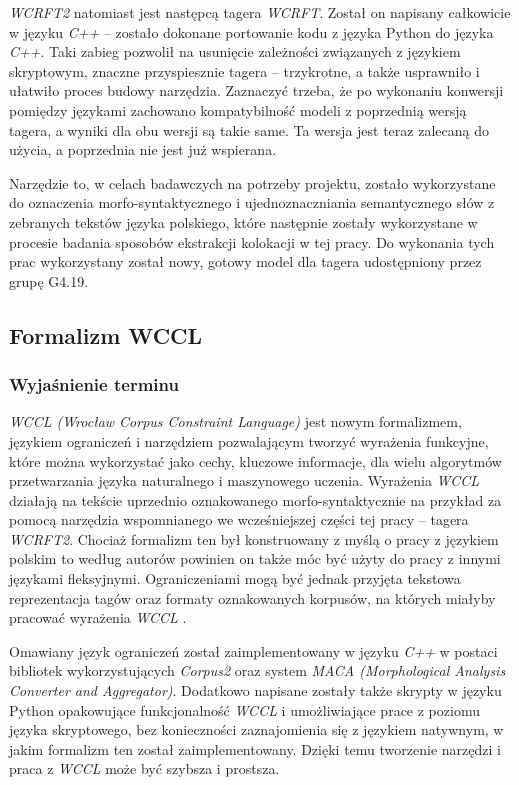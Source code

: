 \documentclass[11pt,a4paper]{llncs}
\begin{document}
\emph{WCRFT2} natomiast jest następcą tagera \emph{WCRFT}.
Został on napisany całkowicie w języku \emph{C++} -- zostało dokonane portowanie kodu z języka Python do języka \emph{C++}.
Taki zabieg pozwolił na usunięcie zależności związanych z językiem skryptowym, znaczne przyspiesznie tagera -- trzykrotne, a także usprawniło i ułatwiło proces budowy narzędzia.
Zaznaczyć trzeba, że po wykonaniu konwersji pomiędzy językami zachowano kompatybilność modeli z poprzednią wersją tagera, a wyniki dla obu wersji są takie same.
Ta wersja jest teraz zalecaną do użycia, a poprzednia nie jest już wspierana.



Narzędzie to, w celach badawczych na potrzeby projektu, zostało wykorzystane do oznaczenia morfo-syntaktycznego i ujednoznaczniania semantycznego słów z zebranych tekstów języka polskiego, które następnie zostały wykorzystane w procesie badania sposobów ekstrakcji kolokacji w tej pracy.
Do wykonania tych prac wykorzystany został nowy, gotowy model dla tagera udostępniony przez grupę G4.19.


\subsection{Formalizm WCCL}


\subsubsection{Wyjaśnienie terminu}
\emph{WCCL (Wrocław Corpus Constraint Language)} jest nowym formalizmem, językiem ograniczeń i narzędziem pozwalającym tworzyć wyrażenia funkcyjne, które można wykorzystać jako cechy, kluczowe informacje, dla wielu algorytmów przetwarzania języka naturalnego i maszynowego uczenia. 
Wyrażenia \emph{WCCL} działają na tekście uprzednio oznakowanego morfo-syntaktycznie na przykład za pomocą narzędzia wspomnianego we wcześniejszej części tej pracy -- tagera \emph{WCRFT2}. 
Chociaż formalizm ten był konstruowany z myślą o pracy z językiem polskim to według autorów powinien on także móc być użyty do pracy z innymi językami fleksyjnymi. 
Ograniczeniami mogą być jednak przyjęta tekstowa reprezentacja tagów oraz formaty oznakowanych korpusów, na których miałyby pracować wyrażenia \emph{WCCL} \cite[str. 1]{wccl}.



Omawiany język ograniczeń został zaimplementowany w języku \emph{C++} w postaci bibliotek wykorzystujących \emph{Corpus2} oraz system \emph{MACA (Morphological Analysis Converter and Aggregator)}. 
Dodatkowo napisane zostały także skrypty w języku Python opakowujące funkcjonalność \emph{WCCL} i umożliwiające prace z poziomu języka skryptowego, bez konieczności zaznajomienia się z językiem natywnym, w jakim formalizm ten został zaimplementowany. 
Dzięki temu tworzenie narzędzi i praca z \emph{WCCL} może być szybsza i prostsza. \cite[str. 3]{wccl}
\end{document}

